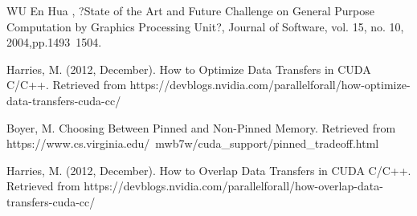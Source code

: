 \documentclass[journal,11pt,onecolumn,draftclsnofoot]{ieeeconf}  %
\begin{document}
\clearpage

\begin{thebibliography}{9}
WU En Hua , ?State of the Art and Future Challenge on General 
Purpose Computation by Graphics Processing Unit?, Journal of 
Software, vol. 15, no. 10, 2004,pp.1493~1504.

Harries, M. (2012, December). How to Optimize Data Transfers in CUDA C/C++. Retrieved from https://devblogs.nvidia.com/parallelforall/how-optimize-data-transfers-cuda-cc/
	
Boyer, M. Choosing Between Pinned and Non-Pinned Memory. Retrieved from https://www.cs.virginia.edu/~mwb7w/cuda_support/pinned_tradeoff.html
	
Harries, M. (2012, December). How to Overlap Data Transfers in CUDA C/C++. Retrieved from https://devblogs.nvidia.com/parallelforall/how-overlap-data-transfers-cuda-cc/
	

\end{thebibliography}
\end{document}
